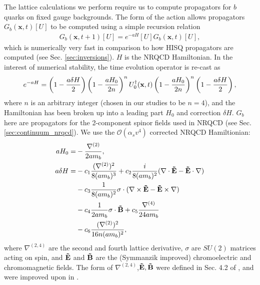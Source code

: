     The lattice calculations we perform require us to compute propagators for $b$ quarks on fixed gauge backgrounds. The form of the action allows propagators $G_b({\textbf{x}},t)[U]$ to be computed using a simple recursion relation
    \begin{align}
      G_b({\textbf{x}},t+1)[U] = e^{-aH}[U] G_b({\textbf{x}},t)[U],
      \label{eq:nrqcd_recursion}
    \end{align}
    which is numerically very fast in comparison to how HISQ propagators are computed (see Sec. \ref{sec:inversions}). $H$ is the NRQCD Hamiltonian. In the interest of numerical stability, the time evolution operator is re-cast as
    \begin{align}
      e^{-aH} = \left(1 - {a\delta H\over 2}\right)\left(1-{aH_0\over 2 n}\right)^n U_0^{\dagger}({\textbf{x}},t) \left(1 - {aH_0\over 2n}\right)^n \left(1-{a\delta H\over 2}\right),
    \end{align}
    where $n$ is an arbitrary integer (chosen in our studies to be $n=4$), and the Hamiltonian has been broken up into a leading part $H_0$ and correction $\delta H$. $G_b$ here are propagators for the 2-component spinor fields used in NRQCD (see Sec. \ref{sec:continuum_nrqcd}). We use the $\mathcal{O}(\alpha_s v^4)$ corrected NRQCD Hamiltionian:
    \begin{align}
      aH_0 =& - {\nabla^{(2)}\over 2am_b} , \\
      \nonumber
      a\delta H =& - c_1 {(\nabla^{(2)})^2 \over 8 (am_b)^3} + c_2{ i\over 8(am_b)^2} ( \nabla\cdot {\bf{\tilde{E}}} - {\bf{\tilde{E}}}\cdot \nabla) \\
      \nonumber
      & - c_3 {1\over 8(am_b)^2} \sigma\cdot ( \nabla\times{\bf{\tilde{E}}} - {\bf{\tilde{E}}}\times\nabla) \\
      \nonumber
      & - c_4 {1\over 2am_b} \sigma\cdot {\bf{\tilde{B}}} + c_5 {\nabla^{(4)}\over 24 am_b} \\
      & - c_6 {(\nabla^{(2)})^2\over 16n (am_b)^2},
      \label{eq:nrqcd_dH}
    \end{align}
    where $\nabla^{(2,4)}$ are the second and fourth lattice derivative, $\sigma$ are $SU(2)$ matrices acting on spin, and ${\bf{\tilde{E}}}$ and ${\bf{\tilde{B}}}$ are the (Symmanzik improved) chromoelectric and chromomagnetic fields. The form of $\nabla^{(2,4)}$,${\bf{\tilde{E}}},{\bf{\tilde{B}}}$ were defined in Sec. 4.2 of \cite{Lepage:1992tx}, and were improved upon in \cite{Gray:2005ur}.

